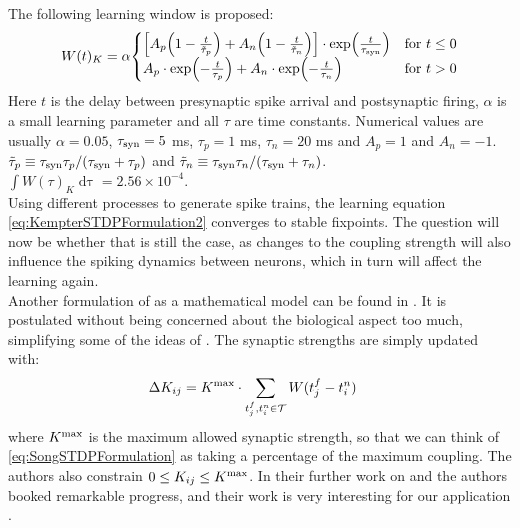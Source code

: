 The following learning window is proposed:
\begin{align}
W(t)_K = \alpha
\begin{cases}
\left[A_{p}\left(1-\frac{t}{\tilde{\tau}_{p}}\right)+A_{n}\left(1-\frac{t}{\tilde{\tau}_{n}}\right)\right] \cdot \exp \left( \frac{t}{\tau_{\rm syn}} \right) & \text{for } t \leq 0 \\
A_{p} \cdot \exp \left(-\frac{t}{\tau_{p}}\right) + A_{n} \cdot \exp \left(-\frac{t}{\tau_{n}} \right) & \text{for } t > 0
\end{cases} \label{eq:learningwindowKempter1999}
\end{align}
Here $t$ is the delay between presynaptic spike arrival and postsynaptic firing, $\alpha$ is a small learning parameter and all $\tau$ are time constants. Numerical values are usually  $\alpha = 0.05$, $\tau_{\rm syn} = 5$ ms, $\tau_{p} = 1$ ms, $\tau_{n} = 20$ ms and $A_p = 1$ and $A_{n} = -1$. $\tilde{\tau}_{p} \equiv \tau_{\rm syn} \tau_{p} / (\tau_{\rm syn} + \tau_{p})$ and $\tilde{\tau}_{n} \equiv \tau_{\rm syn} \tau_{n} / (\tau_{\rm syn} + \tau_{n})$. \\
$\int W(\tau)_K \mathop{d \tau} = 2.56 \times 10^{-4}$. \\

Using different processes to generate spike trains, the learning equation \eqref{eq:KempterSTDPFormulation2} converges to stable fixpoints. The question will now be whether that is still the case, as changes to the coupling strength will also influence the spiking dynamics between neurons, which in turn will affect the learning again.\\

Another formulation of \STDP as a mathematical model can be found in \cite{Song2000}. It is postulated without being concerned about the biological aspect too much, simplifying some of the ideas of \cite{Kempter1999}. The synaptic strengths are simply updated with:
\begin{align}
\Delta K_{ij} &= K^{\rm max} \cdot \sum_{t_{j}^{f}, t_i^{n} \in \mathcal{T}} W (t_{j}^{f}-t_i^{n} ) \label{eq:SongSTDPFormulation}
\end{align}
where $K^{\rm max}$ is the maximum allowed synaptic strength, so that we can think of \eqref{eq:SongSTDPFormulation} as taking a percentage of the maximum coupling. The authors also constrain $0 \leq K_{ij} \leq K^{\rm max}$. In their further work on \STDP and \IP the authors booked remarkable progress, and their work is very interesting for our application \cite{Song2017}. \\

